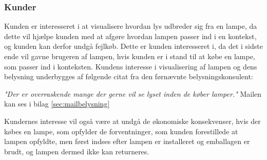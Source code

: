\subsubsection{Kunder}
Kunden er interesseret i at visualisere hvordan lys udbreder sig fra en lampe, da dette vil hjælpe kunden med at afgøre hvordan lampen passer ind i en kontekst, og kunden kan derfor undgå fejlkøb. Dette er kunden interesseret i, da det i sidste ende vil gavne brugeren af lampen, hvis kunden er i stand til at købe en lampe, som passer ind i konteksten. Kundens interesse i visualisering af lampen og dens belysning underbygges af følgende citat fra den førnævnte belysningskonsulent:
\begin{center}
\textit{"Der er overraskende mange der gerne vil se lyset inden de køber lamper."} Mailen kan ses i bilag \ref{sec:mailbelysning} 
\end{center}

Kundernes interesse vil også være at undgå de økonomiske konsekvenser, hvis der købes en lampe, som opfylder de forventninger, som kunden forestillede at lampen opfyldte, men først indses efter lampen er installeret og emballagen er brudt, og lampen dermed ikke kan returneres.